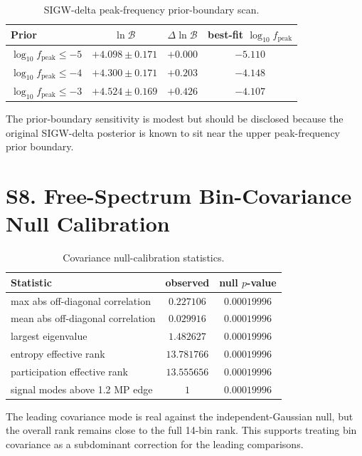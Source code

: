 \documentclass[aps,prl,superscriptaddress,nofootinbib]{revtex4-2}
\begin{document}
\begin{table}[H]
\caption{\label{tab:prior}SIGW-delta peak-frequency prior-boundary scan.}
\begin{ruledtabular}
\begin{tabular}{lccc}
Prior & $\ln\mathcal{B}$ & $\Delta\ln\mathcal{B}$ & best-fit $\log_{10} f_\mathrm{peak}$ \\
\hline
$\log_{10}f_\mathrm{peak}\le -5$ & $+4.098\pm0.171$ & $+0.000$ & $-5.110$ \\
$\log_{10}f_\mathrm{peak}\le -4$ & $+4.300\pm0.171$ & $+0.203$ & $-4.148$ \\
$\log_{10}f_\mathrm{peak}\le -3$ & $+4.524\pm0.169$ & $+0.426$ & $-4.107$ \\
\end{tabular}
\end{ruledtabular}
\end{table}

The prior-boundary sensitivity is modest but should be disclosed because the
original SIGW-delta posterior is known to sit near the upper peak-frequency
prior boundary.

\section*{S8. Free-Spectrum Bin-Covariance Null Calibration}

\begin{table}[H]
\caption{\label{tab:car}Covariance null-calibration statistics.}
\begin{ruledtabular}
\begin{tabular}{lcc}
Statistic & observed & null $p$-value \\
\hline
max abs off-diagonal correlation & $0.227106$ & $0.00019996$ \\
mean abs off-diagonal correlation & $0.029916$ & $0.00019996$ \\
largest eigenvalue & $1.482627$ & $0.00019996$ \\
entropy effective rank & $13.781766$ & $0.00019996$ \\
participation effective rank & $13.555656$ & $0.00019996$ \\
signal modes above 1.2 MP edge & $1$ & $0.00019996$ \\
\end{tabular}
\end{ruledtabular}
\end{table}

The leading covariance mode is real against the independent-Gaussian null, but
the overall rank remains close to the full 14-bin rank.  This supports treating
bin covariance as a subdominant correction for the leading comparisons.
\end{document}
